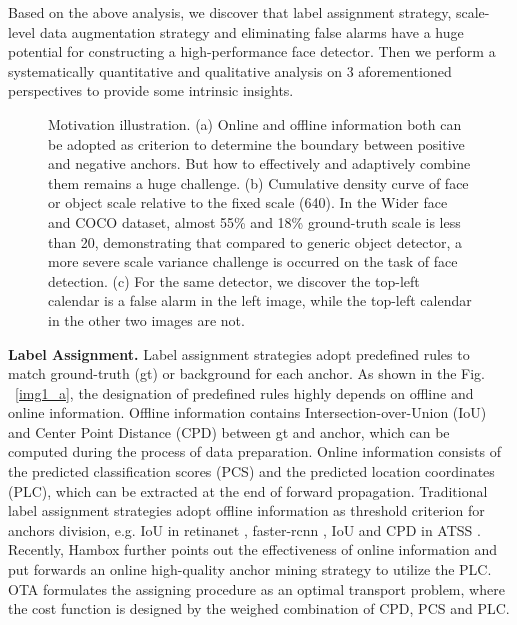 \documentclass[10pt,twocolumn,letterpaper]{article}
\begin{document}
Based on the above analysis, we discover that label assignment strategy, scale-level data augmentation strategy and eliminating false alarms have a huge potential for constructing a high-performance face detector. 
Then we perform a systematically quantitative and qualitative analysis  on 3 aforementioned perspectives to provide some intrinsic insights.

\begin{figure*}[t]
    \caption{Motivation illustration. (a) 
    Online and offline information both can be adopted as criterion to determine the boundary between positive and negative anchors. But how to effectively and adaptively combine them remains a huge challenge.
    (b) Cumulative density curve of face or object scale relative to the fixed scale (640). In the Wider face and COCO dataset, almost 55\% and 18\% ground-truth scale is less than 20, demonstrating that compared to generic object detector, a more severe scale variance challenge is occurred on the task of face detection. (c) For the same detector, we discover the top-left calendar is a false alarm in the left image, while  the top-left calendar in the other two images are not.}
    \label{img1}
\end{figure*}

\noindent\textbf{Label Assignment.} Label assignment strategies adopt predefined rules to match ground-truth (gt) or background for each anchor. As shown in the Fig. ~\ref{img1_a}, the designation of predefined rules highly depends on  offline and online information. Offline information contains Intersection-over-Union (IoU) and Center Point Distance (CPD) between gt and anchor, which can be computed during the process of data preparation. Online information consists of the predicted classification scores (PCS) and the predicted location coordinates (PLC), which can be extracted at the end of forward propagation. Traditional label assignment strategies adopt offline information as threshold criterion for  anchors division, e.g. IoU in retinanet \cite{lin2017focal}, faster-rcnn \cite{ren2015faster}, IoU and CPD in ATSS \cite{zhang2020bridging}. Recently, Hambox \cite{liu2019hambox} further points out the effectiveness of online information and put forwards an online high-quality anchor mining strategy to utilize the PLC. OTA \cite{ge2021ota} formulates the assigning procedure as an optimal transport problem, where the cost function is  designed by the weighed combination of CPD, PCS and PLC. 
\end{document}
